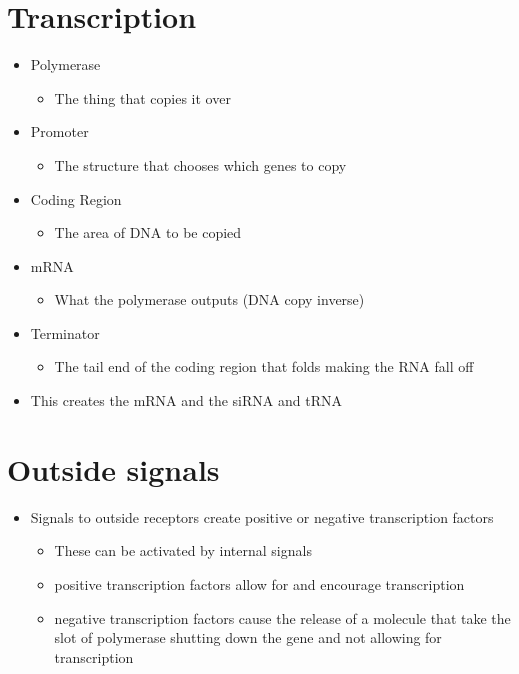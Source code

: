 \documentclass[letterpaper]{article}
\author{Zachary Sayyah}
\date{\today}
\title{}
\renewcommand{\tableofcontents}{}
\begin{document}
\tableofcontents



\section{Transcription}
\label{sec:orgbdc5ac5}
\begin{itemize}
\item Polymerase

\begin{itemize}
\item The thing that copies it over
\end{itemize}

\item Promoter

\begin{itemize}
\item The structure that chooses which genes to copy
\end{itemize}

\item Coding Region

\begin{itemize}
\item The area of DNA to be copied
\end{itemize}

\item mRNA

\begin{itemize}
\item What the polymerase outputs (DNA copy inverse)
\end{itemize}

\item Terminator

\begin{itemize}
\item The tail end of the coding region that folds making the RNA fall off
\end{itemize}

\item This creates the mRNA and the siRNA and tRNA
\end{itemize}

\section{Outside signals}
\label{sec:orgb3799f1}
\begin{itemize}
\item Signals to outside receptors create positive or negative transcription
factors

\begin{itemize}
\item These can be activated by internal signals
\item positive transcription factors allow for and encourage transcription
\item negative transcription factors cause the release of a molecule that
take the slot of polymerase shutting down the gene and not allowing
for transcription
\end{itemize}
\end{itemize}
\end{document}
